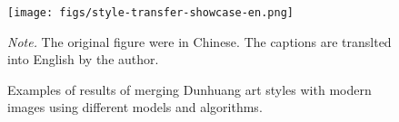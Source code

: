 \begin{figure}
    \caption{Examples of results of merging Dunhuang art styles with modern images using different 
    models and algorithms.}
    \label{fig:style-transfer-showcase}
    
    \begin{center}
        \texttt{[image: figs/style-transfer-showcase-en.png]}
    \end{center}

    \small\textit{Note.} The original figure were in Chinese. The captions are translted into English
    by the author. 
\end{figure}

\printbibliography